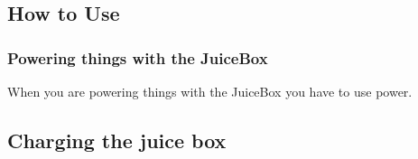 \documentclass[../jb_user_manual.tex]{subfiles}
\begin{document}
\subsection{How to Use}
\subsubsection{Powering things with the JuiceBox}
When you are powering things with the JuiceBox you have to use power.
\subsection{Charging the juice box}
\end{document}
